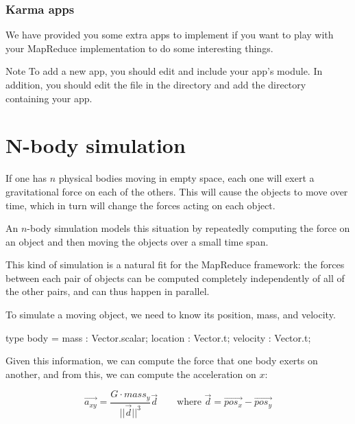 \documentclass{pset}
\date{Due Thursday, April 17}
\newcommand{\widevec}[1]{\overrightarrow{#1}}
\begin{document}
\maketitle{}

\section*{Karma apps}

We have provided you some extra apps to implement if you want to play with your
MapReduce implementation to do some interesting things.

\begin{note}{Note}
To add a new app, you should edit  and include your
app's module.  In addition, you should edit the file  in the
 directory and add the directory containing your app.
\end{note}

\part{N-body simulation}
If one has $n$ physical bodies moving in empty space, each one will exert a
gravitational force on each of the others.  This will cause the objects to move
over time, which in turn will change the forces acting on each object.

An $n$-body simulation models this situation by repeatedly computing the force
on an object and then moving the objects over a small time span.

This kind of simulation is a natural fit for the MapReduce framework: the forces
between each pair of objects can be computed completely independently of all of
the other pairs, and can thus happen in parallel.

To simulate a moving object, we need to know its position, mass, and
velocity.
\begin{ocaml}
type body = {
  mass     : Vector.scalar;
  location : Vector.t;
  velocity : Vector.t;
}
\end{ocaml}

Given this information, we can compute the force that one body exerts on
another, and from this, we can compute the acceleration on $x$:

\begin{displaymath}
\widevec{a_{xy}} = \frac{G \cdot mass_y}{||\widevec{d}||^3} \widevec{d}
\qquad \textrm{where } \widevec{d} = \widevec{pos_x} - \widevec{pos_y}
\end{displaymath}
\end{document}
